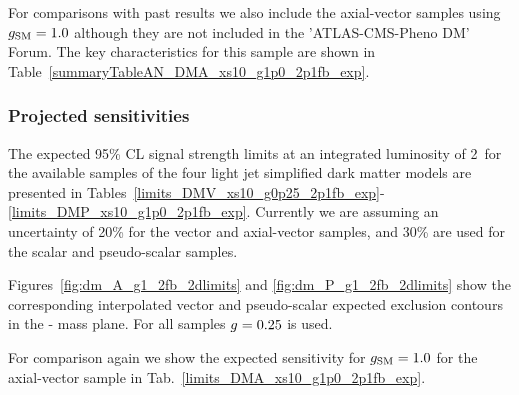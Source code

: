 \clearpage 

\clearpage
For comparisons with past results we also include the axial-vector samples using $g_{\rm SM} = 1.0$ although they are not included in the 
'ATLAS-CMS-Pheno DM' Forum. The key characteristics for this sample are shown in Table~\ref{summaryTableAN_DMA_xs10_g1p0_2p1fb_exp}.




\subsubsection{Projected sensitivities}

The expected 95\% CL signal strength limits at an integrated luminosity of 2~\ifb for
the available samples of the four light jet simplified dark matter models are
presented in
Tables~\ref{limits_DMV_xs10_g0p25_2p1fb_exp}-\ref{limits_DMP_xs10_g1p0_2p1fb_exp}.
Currently we are assuming an uncertainty of 20\% for the vector and axial-vector samples, and 30\% are used 
for the scalar and pseudo-scalar samples.


Figures~\ref{fig:dm_A_g1_2fb_2dlimits} and \ref{fig:dm_P_g1_2fb_2dlimits} show
the corresponding interpolated vector and pseudo-scalar expected exclusion 
contours in the {\mphi-\mchi} mass plane. For all samples $g_{\rm}=0.25$ is used.



\clearpage

%
% 
% 
% 

\clearpage
For comparison again we show the expected sensitivity for $g_{\rm SM}=1.0$ for the axial-vector sample in Tab.~\ref{limits_DMA_xs10_g1p0_2p1fb_exp}.

% 
\clearpage









